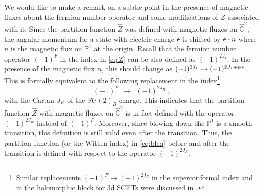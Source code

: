 We would like to make a remark on a subtle point in the presence of magnetic fluxes about the fermion number operator and some modifications of $Z$ associated with it. Since the partition function $\hat{Z}$ was defined with magnetic fluxes on $\hat{\mathbb{C}}^2$, the angular momentum for a state with electric charge $\sf{e}$ is shifted by ${\sf e}\cdot n$ where $n$ is the magnetic flux on $\mathbb{P}^1$ at the origin. Recall that the fermion number operator $(-1)^F$ in the index in \eqref{eq:Z} can be also defined as $(-1)^{2J_1}$. In the presence of the magnetic flux $n$, this should change as $(-1)^{2J_1} \rightarrow (-1)^{2J_1+{\sf e}\cdot n}$. This is formally equivalent to the following replacement in the index\footnote{Similar replacements $(-1)^F\rightarrow (-1)^{2J_R}$ in the superconformal index and in the holomorphic block for 3d SCFTs were discussed in \cite{Dimofte:2011py,Beem:2012mb}.}
\begin{equation}\label{eq:F-JR}
	(-1)^F \ \ \rightarrow \ \ (-1)^{2J_R} \ ,
\end{equation}
with the Cartan $J_R$ of the $SU(2)_R$ charge. This indicates that the partition function $\hat{Z}$ with magnetic fluxes on $\hat{\mathbb{C}}^2$ is in fact defined with the operator $(-1)^{2J_R}$ instead of $(-1)^F$. Moreover, since blowing down the $\mathbb{P}^1$ is a smooth transition, this definition is still valid even after the transition. Thus, the partition function (or the Witten index) in \eqref{eq:bleq} before and after the transition is defined with respect to the operator $(-1)^{2J_R}$.

